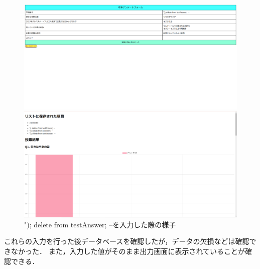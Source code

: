 \documentclass[titlepage,a4paper]{jsarticle}
\begin{document}
\begin{figure}[H]
  \centering
  \begin{minipage}[t]{0.45\textwidth}
    \centering
    \includegraphics[width=\textwidth]{img/security/before_2.png}
  \end{minipage}
  \hfill %
  \begin{minipage}[t]{0.45\textwidth}
    \centering
    \includegraphics[width=\textwidth]{img/security/after_2.png}
  \end{minipage}
  \caption{"); delete from testAnswer; --を入力した際の様子}
  \label{SQL_Injection2}
\end{figure}

これらの入力を行った後データベースを確認したが，データの欠損などは確認できなかった．
また，入力した値がそのまま出力画面に表示されていることが確認できる．
\end{document}
